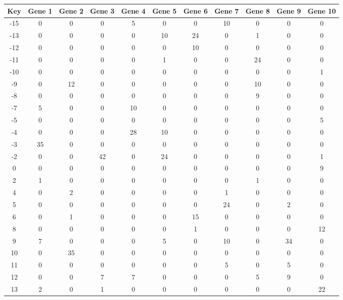 \begin{tabular}{|c|c|c|c|c|c|c|c|c|c|c|}
\hline
Key & Gene 1 & Gene 2 & Gene 3 & Gene 4 & Gene 5 & Gene 6 & Gene 7 & Gene 8 & Gene 9 & Gene 10 \\
\hline
-15 & 0 & 0 & 0 & 5 & 0 & 0 & 10 & 0 & 0 & 0 \\
-13 & 0 & 0 & 0 & 0 & 10 & 24 & 0 & 1 & 0 & 0 \\
-12 & 0 & 0 & 0 & 0 & 0 & 10 & 0 & 0 & 0 & 0 \\
-11 & 0 & 0 & 0 & 0 & 1 & 0 & 0 & 24 & 0 & 0 \\
-10 & 0 & 0 & 0 & 0 & 0 & 0 & 0 & 0 & 0 & 1 \\
-9 & 0 & 12 & 0 & 0 & 0 & 0 & 0 & 10 & 0 & 0 \\
-8 & 0 & 0 & 0 & 0 & 0 & 0 & 0 & 9 & 0 & 0 \\
-7 & 5 & 0 & 0 & 10 & 0 & 0 & 0 & 0 & 0 & 0 \\
-5 & 0 & 0 & 0 & 0 & 0 & 0 & 0 & 0 & 0 & 5 \\
-4 & 0 & 0 & 0 & 28 & 10 & 0 & 0 & 0 & 0 & 0 \\
-3 & 35 & 0 & 0 & 0 & 0 & 0 & 0 & 0 & 0 & 0 \\
-2 & 0 & 0 & 42 & 0 & 24 & 0 & 0 & 0 & 0 & 1 \\
0 & 0 & 0 & 0 & 0 & 0 & 0 & 0 & 0 & 0 & 9 \\
2 & 1 & 0 & 0 & 0 & 0 & 0 & 0 & 1 & 0 & 0 \\
4 & 0 & 2 & 0 & 0 & 0 & 0 & 1 & 0 & 0 & 0 \\
5 & 0 & 0 & 0 & 0 & 0 & 0 & 24 & 0 & 2 & 0 \\
6 & 0 & 1 & 0 & 0 & 0 & 15 & 0 & 0 & 0 & 0 \\
8 & 0 & 0 & 0 & 0 & 0 & 1 & 0 & 0 & 0 & 12 \\
9 & 7 & 0 & 0 & 0 & 5 & 0 & 10 & 0 & 34 & 0 \\
10 & 0 & 35 & 0 & 0 & 0 & 0 & 0 & 0 & 0 & 0 \\
11 & 0 & 0 & 0 & 0 & 0 & 0 & 5 & 0 & 5 & 0 \\
12 & 0 & 0 & 7 & 7 & 0 & 0 & 0 & 5 & 9 & 0 \\
13 & 2 & 0 & 1 & 0 & 0 & 0 & 0 & 0 & 0 & 22 \\
\hline
\end{tabular}